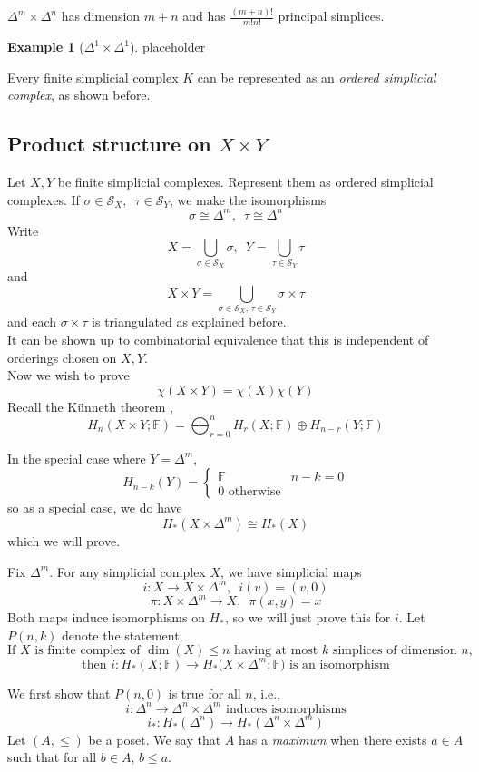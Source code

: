 \documentclass[a4paper,14pt]{extarticle}
\theoremstyle{definition}
\newtheorem*{eg}{Example}
\begin{document}
$\Delta^m\times\Delta^n$ has dimension $m+n$ and has $\frac{(m+n)!}{m!n!}$ principal simplices.

\begin{eg}[$\Delta^1\times\Delta^1$]
	placeholder
\end{eg}

Every finite simplicial complex $K$ can be represented as an \emph{ordered simplicial complex},
as shown before.

\subsection{Product structure on $X\times Y$}
Let $X,Y$ be finite simplicial complexes. Represent them as ordered simplicial complexes.
If $\sigma\in\mathcal{S}_X, \,\,\,\tau\in\mathcal{S}_Y$, we make the isomorphisms 
\[\sigma\cong\Delta^m, \,\,\,\tau\cong\Delta^n\]
Write \[X=\bigcup_{\sigma\in\mathcal{S}_X}\sigma,\,\,\,Y=\bigcup_{\tau\in\mathcal{S}_Y} \tau\]
and 
\[X\times Y=\bigcup_{\sigma\in\mathcal{S}_X, \,\tau\in\mathcal{S}_Y}\sigma\times\tau\]
and each $\sigma\times\tau$ is triangulated as explained before. \\

It can be shown up to combinatorial equivalence that this is independent of orderings chosen 
on $X,Y$. \\

Now we wish to prove 
\[\chi(X\times Y)=\chi(X)\chi(Y)\]
Recall the Künneth theorem ,
\[H_n(X\times Y;\mathbb{F})=\bigoplus_{r=0}^n H_r(X;\mathbb{F})\oplus H_{n-r}(Y;\mathbb{F})\]

In the special case where $Y=\Delta^m$, 
\[H_{n-k}(Y)=\begin{cases}
	\mathbb{F}&n-k=0\\0\text{ otherwise}
\end{cases}\]
so as a special case, we do have 
\[H_*(X\times\Delta^m)\cong H_*(X)\]
which we will prove.

Fix $\Delta^m$. For any simplicial complex $X$, we have simplicial maps 
\[i:X\rightarrow X\times\Delta^m,\,\,\,i(v)=(v,0)\]
\[\pi:X\times\Delta^m\rightarrow X, \,\,\,\pi(x,y)=x\]
Both maps induce isomorphisms on $H_*$, so we will just prove this for $i$.
Let $P(n,k)$ denote the statement,
\[\text{If $X$ is finite complex of $\dim(X)\leq n$ having at most $k$ simplices 
of dimension $n$,}\]
\[\text{then $i:H_*(X;\mathbb{F})\rightarrow H_*(X\times\Delta^m;\mathbb{F}$) is
an isomorphism}\]

We first show that $P(n,0)$ is true for all $n$, i.e.,
\[i:\Delta^n\rightarrow\Delta^n\times\Delta^m\text{ induces isomorphisms}\]
\[i_*:H_*(\Delta^n)\rightarrow H_*(\Delta^n\times\Delta^m)\]
Let $(A,\leq)$ be a poset. We say that $A$ has a \emph{maximum} when there exists 
$a\in A$ such that for all $b\in A$, $b\leq a$.
\end{document}
